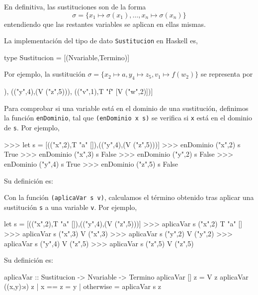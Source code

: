 En definitiva, las sustituciones son de la forma
$$\sigma = \{ x_1 \mapsto \sigma(x_1), \dots, x_n \mapsto \sigma(x_n)\}$$ 
entendiendo que las restantes variables se aplican en ellas mismas.

La implementación del tipo de dato
\texttt{Sustitucion} en Haskell es,

\begin{codigo}
  type Sustitucion = [(Nvariable,Termino)]
\end{codigo}

Por ejemplo, la sustitución
$\sigma = \{ x_2 \mapsto a, y_4 \mapsto z_5, v_1 \mapsto f(w_2) \}$ 
se representa por 
\begin{sesion}
[(("x",2),T "a" []),
 (("y",4),(V ("z",5))),
 (("v",1),T "f" [V ("w",2)])]
\end{sesion}

Para comprobar si una variable está en el dominio de una sustitución, definimos
la función \texttt{enDominio}, tal que \texttt{(enDominio x s)} se verifica si
\texttt{x} está en el dominio de \texttt{s}. Por ejemplo,

\begin{sesion}
>>> let s = [(("x",2),T "a" []),(("y",4),(V ("z",5)))]
>>> enDominio ("x",2) s
True
>>> enDominio ("x",3) s
False
>>> enDominio ("y",2) s
False
>>> enDominio ("y",4) s
True
>>> enDominio ("z",5) s
False
\end{sesion}

Su definición es:


Con la función \texttt{(aplicaVar s v)}, calculamos el término
obtenido tras aplicar una sustitución \texttt{s} a una variable
\texttt{v}. Por ejemplo,

\begin{sesion}
let s = [(("x",2),T "a" []),(("y",4),(V ("z",5)))]
>>> aplicaVar s ("x",2)
T "a" []
>>> aplicaVar s ("x",3)
V ("x",3)
>>> aplicaVar s ("y",2)
V ("y",2)
>>> aplicaVar s ("y",4)
V ("z",5)
>>> aplicaVar s ("z",5)
V ("z",5)
\end{sesion}

Su definición es:

\begin{codigo}
aplicaVar :: Sustitucion -> Nvariable -> Termino 
aplicaVar [] z = V z 
aplicaVar ((x,y):s) z 
  | x == z    = y
  | otherwise = aplicaVar s z
\end{codigo}

